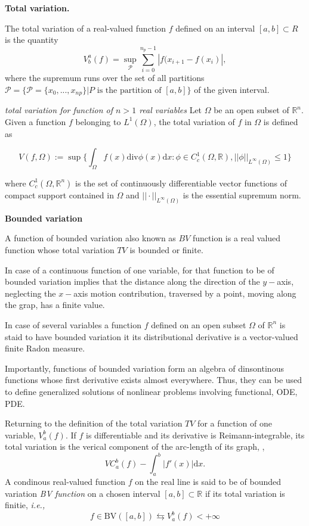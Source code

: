 \textbf{Total variation.} 

The total variation of a real-valued function $f$ defined on an interval $[a,b]\subset R$ is the quantity 
\begin{equation}
V_b ^a (f) = \sup_{\mathcal{P}}\sum_{i=0}^{n_p -1}|f(x_{i+1} - f(x_i)|,
\end{equation}
where the supremum runs over the set of all partitions $\mathcal{P} = \{\mathcal{P}=\{x_0,...,x_{np}\}|P\text{ is the partition of }[a,b]\}$ of the given interval. 


\textit{total variation for function of $n>1$ real variables} 
Let $\Omega$ be an open subset of $\mathbb{R}^n$. Given a function $f$ belonging to $L^1(\Omega)$, the total variation of $f$ in $\Omega$ is defined as 

\begin{equation}
V(f,\Omega):=\sup\Bigg\{\int_{\Omega}f(x)\text{div}\phi(x)\text{d}x:\phi\in C_{c}^1(\Omega, \mathbb{R}), ||\phi||_{L^{\infty}(\Omega)}\leq 1\Bigg\}
\end{equation}

where $C_c ^1(\Omega, \mathbb{R}^n)$ is the set of continuously differentiable vector functions of compact support contained in $\Omega$ and $||\cdot||_{L^{\infty}(\Omega)}$ is the essential supremum norm. 

\textbf{Bounded variation} 

A function of bounded variation also known as $BV$ function is a real valued function whose total variation $TV$ is bounded or finite. 

In case of a continuous function of one variable, for that function to be of bounded variation implies that the distance along the direction of the $y-$axis, neglecting the $x-$axis motion contribution, traversed by a point, moving along the grap, has a finite value. 

In case of several variables a function $f$ defined on an open subset $\Omega$ of $\mathbb{R}^n$ is staid to have bounded variation it its distributional derivative is a vector-valued finite Radon measure.

Importantly, functions of bounded variation form an algebra of dinsontinous functions whose first derivative exists almost everywhere. Thus, they can be used to define generalized solutions of nonlinear problems involving functional, \ac{ODE}, \ac{PDE}.

Returning to the definition of the total variation $TV$ for a function of one variable, $V_a ^b (f)$. If $f$ is differentiable and its derivative is Reimann-integrable, its total variation is the verical component of the arc-length of its graph, \ie,
%
\begin{equation}
VC_a ^b(f) - \int_a ^b |f'(x)|\text{d}x.
\end{equation}
%
A condinous real-valued function $f$ on the real line is said to be of bounded variation \textit{BV function} on a chosen interval $[a, b]\subset \mathbb{R}$ if its total variation is finitie, \textit{i.e.,}
%
\begin{equation}
f\in\text{BV}([a,b]) \leftrightarrows V_a ^b (f) < +\infty
\end{equation}

